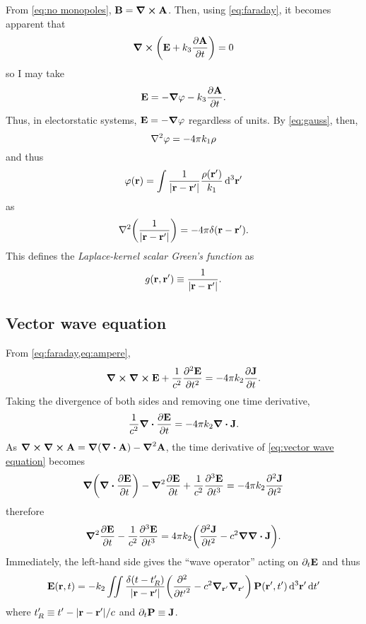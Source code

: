 From \cref{eq:no monopoles}, $\vb{B} = \curl{\vb{A}}$. 
Then, using \cref{eq:faraday}, it becomes apparent that
\begin{equation*}
  \curl{\qty(\vb{E} + k_3 \pdv{\vb{A}}{t})} = 0
\end{equation*}
so I may take
\begin{equation*}
  \vb{E} = -\grad{\varphi} - k_3 \pdv{\vb{A}}{t}.
\end{equation*}
Thus, in electorstatic systems, $\vb{E} = -\grad{\varphi}$ regardless of units.
By \cref{eq:gauss}, then,
\begin{equation*}
  \laplacian \varphi = -4 \pi k_1 \rho
\end{equation*}
and thus
\begin{equation*}
  \varphi(\vb{r}) = \int \frac{1}{\abs{\vb{r} - \vb{r}'}} \frac{\rho(\vb{r}')}{k_1} \dd[3]{\vb{r}'}
\end{equation*}
as
\begin{equation*}
  \laplacian \qty(\frac{1}{\abs{\vb{r} - \vb{r}'}}) = -4 \pi \delta(\vb{r} - \vb{r}').
\end{equation*}
This defines the \emph{Laplace-kernel scalar Green's function} as
\begin{equation}
  g(\vb{r}, \vb{r}') \equiv \frac{1}{\abs{\vb{r} - \vb{r}'}}.
  \label{eq:scalar green}
\end{equation}

\subsection{Vector wave equation}

From \cref{eq:faraday,eq:ampere},
\begin{equation}
  \curl{\curl{\vb{E}}} + \frac{1}{c^2} \pdv[2]{\vb{E}}{t} = -4\pi k_2 \pdv{\vb{J}}{t}.
  \label{eq:vector wave equation}
\end{equation}
Taking the divergence of both sides and removing one time derivative,
\begin{equation*}
  \frac{1}{c^2} \div{\pdv{\vb{E}}{t}} = -4 \pi k_2 \div{\vb{J}}.
\end{equation*}
As $\curl{\curl{\vb{A}}} = \grad{\qty(\div{\vb{A}})} - \grad^2{\vb{A}}$, the time derivative of \cref{eq:vector wave equation} becomes
\begin{equation*}
  \grad{\qty(\div{\pdv{\vb{E}}{t}})} - \grad^2 \pdv{\vb{E}}{t} + \frac{1}{c^2} \pdv[3]{\vb{E}}{t} = -4\pi k_2 \pdv[2]{\vb{J}}{t}
\end{equation*}
therefore
\begin{equation*}
  \grad^2 \pdv{\vb{E}}{t} - \frac{1}{c^2} \pdv[3]{\vb{E}}{t} = 4\pi k_2 \qty(\pdv[2]{\vb{J}}{t} - c^2 \grad \div{\vb{J}}).
\end{equation*}
Immediately, the left-hand side gives the ``wave operator'' acting on $\partial_t \vb{E}$ and thus
\begin{equation}
  \vb{E}(\vb{r}, t) = -k_2 \iint \frac{\delta\qty(t - t'_R )}{\abs{\vb{r} - \vb{r}'}} \qty(\pdv[2]{{t'}} - c^2 \grad_{\vb{r}'} \grad_{\vb{r}'}) \, \vb{P}(\vb{r}', t') \dd[3]{\vb{r}'} \dd{t'}
\end{equation}
where $t'_R \equiv t' - \abs{\vb{r} - \vb{r}'}/c$ and $\partial_t \vb{P} \equiv \vb{J}$.

